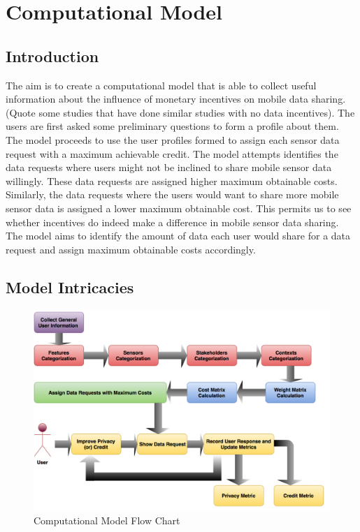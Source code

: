 \chapter{Computational Model} \label{model}

\newcommand{\numcategories}[0]{$cat$ }
\newcommand{\numsubcategories}[0]{$cat$ }
\newcommand{\numsensors}[0]{$N_S$ }
\newcommand{\numstakeholders}[0]{$N_{DC}$ }
\newcommand{\numcontexts}[0]{$N_C$ }
\newcommand{\numquestions}[0]{$N_{DR}$ } 
\newcommand{\numsubfeatures}[0]{$num_{sf}$ } 



\section{Introduction}
The aim is to create a computational model that is able to collect useful information about the influence of monetary incentives on mobile
data sharing. (Quote some studies that have done similar studies with no data incentives). 
The users are first asked some preliminary questions to form a profile about them. The model proceeds to use the user profiles 
formed to assign each sensor data request
with a maximum achievable credit. The model attempts identifies the data requests where users might not be inclined to share mobile sensor data willingly. These data requests are assigned higher maximum obtainable costs. Similarly, the data requests where the users would want to share more mobile sensor data
is assigned a lower maximum obtainable cost. This permits us to see whether incentives do indeed make a difference in mobile sensor
data sharing. The model aims to identify the amount of data each user would share for a data request and assign maximum obtainable costs accordingly.

\section{Model Intricacies}

\begin{figure}[ht!]
\centering
\includegraphics[width=\textwidth,keepaspectratio]{./images/model_building_blocks}
\caption{Computational Model Flow Chart \label{model_blocks}}
\end{figure}

